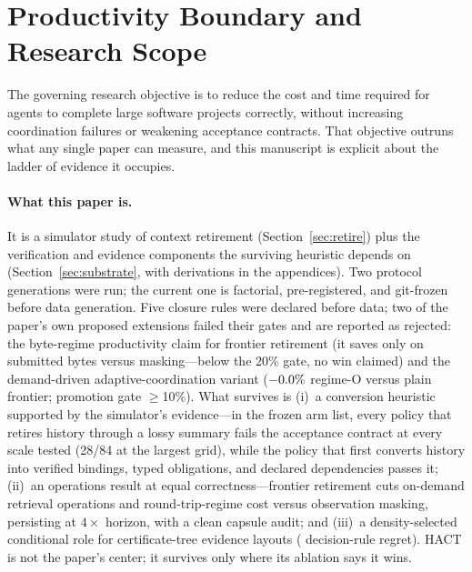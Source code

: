\section{Productivity Boundary and Research Scope}\label{sec:productivity}
The governing research objective is to reduce the cost and time
required for agents to complete large software projects correctly,
without increasing coordination failures or weakening acceptance
contracts. That objective outruns what any single paper can measure,
and this manuscript is explicit about the ladder of evidence it
occupies.

\paragraph{What this paper is.}
It is a simulator study of context retirement
(Section~\ref{sec:retire}) plus the verification and evidence
components the surviving heuristic depends on
(Section~\ref{sec:substrate}, with derivations in the appendices). Two protocol generations
were run; the current one is factorial, pre-registered, and
git-frozen before data generation. Five closure rules were declared
before data; two of the paper's own proposed extensions failed their
gates and are reported as rejected: the byte-regime productivity
claim for frontier retirement (it saves only \RetwoBytesWin{} on
submitted bytes versus masking---below the 20\% gate, no win claimed)
and the demand-driven
adaptive-coordination variant ($-0.0\%{}$ regime-O
versus plain frontier; promotion gate $\ge$10\%). What survives is
(i)~a conversion heuristic supported by the simulator's evidence---in
the frozen arm list, every policy that retires history through a lossy
summary fails the acceptance contract at every
scale tested (28/84 at the largest grid), while the policy that first
converts history into
verified bindings, typed obligations, and declared
dependencies passes it; (ii)~an operations result
at equal correctness---frontier retirement cuts on-demand retrieval
operations \RetwoOpsReduction{} and round-trip-regime cost
\RetwoCostOReduction{} versus observation masking, persisting at
$4\times$ horizon, with a clean capsule audit; and (iii)~a
density-selected conditional role for certificate-tree evidence
layouts (\RetwoDensityRegret{} decision-rule regret). HACT is not the
paper's center; it survives only where its ablation says it wins.

